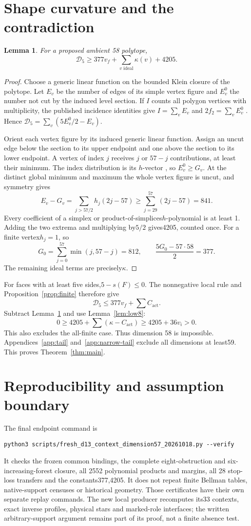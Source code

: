 \documentclass[11pt]{article}
\newtheorem{lemma}[theorem]{Lemma}
\theoremstyle{remark}\newtheorem{remark}[theorem]{Remark}
\newcommand{\Dfive}{\mathcal D_5}
\newcommand{\act}{\mathrm{act}}
\begin{document}
\section{Shape curvature and the contradiction}
\begin{lemma}\label{lem:shape}
For a proposed ambient 58 polytope,
\[
 \Dfive\ge377v_f+\sum_{v\text{ ideal}}\kappa(v)+4205.
\]
\end{lemma}
\begin{proof}
Choose a generic linear function on the bounded Klein closure of
the polytope. Let $E_v$ be the number of edges of its simple vertex
figure and $E_v^0$ the number not cut by the induced level section.
If $I$ counts all polygon vertices with multiplicity, the published
incidence identities give $I=\sum_vE_v$ and
$2f_2=\sum_vE_v^0$ \cite[Theorem9]{Khovanskii}. Hence
$\Dfive=\sum_v(5E_v^0/2-E_v)$.

Orient each vertex figure by its induced generic linear function.
Assign an uncut edge below the section to its upper endpoint and
one above the section to its lower endpoint. A vertex of index $j$
receives $j$ or $57-j$ contributions, at least their minimum.
The index distribution is its $h$-vector
\cite[Theorems2 and 6]{Khovanskii}, so $E_v^0\ge G_v$.
At the distinct global minimum and maximum the whole
vertex figure is uncut, and symmetry gives
\[
 E_v-G_v=\sum_{j>57/2}h_j(2j-57)\ge\sum_{j=29}^{57}(2j-57)=841.
\]
Every coefficient of a simplex or product-of-simplices$h$-polynomial is
at least 1. Adding the two extrema and multiplying by$5/2$ gives4205,
counted once. For a finite vertex$h_j=1$, so
\[
 G_0=\sum_{j=0}^{57}\min(j,57-j)=812,
 \qquad\frac{5G_0-57\cdot58}{2}=377.
\]
The remaining ideal terms are precisely$\kappa$.
\end{proof}

For faces with at least five sides,$5-s(F)\le0$. The nonnegative local
rule and Proposition~\ref{prop:finite} therefore give
\[
 \Dfive\le377v_f+\sum C_{\act}.
\]
Subtract Lemma~\ref{lem:shape} and use Lemma~\ref{lem:low8}:
\[
 0\ge4205+\sum(\kappa-C_{\act})\ge4205+36v_i>0.
\]
This also excludes the all-finite case. Thus dimension 58 is impossible.
Appendices~\ref{app:tail} and~\ref{app:narrow-tail} exclude all
dimensions at least59. This proves Theorem~\ref{thm:main}.

\section{Reproducibility and assumption boundary}
The final endpoint command is
\begin{verbatim}
python3 scripts/fresh_d13_context_dimension57_20261018.py --verify
\end{verbatim}
It checks the frozen common bindings, the complete eight-obstruction and
six-increasing-forest closure, all 2552 polynomial products and margins,
all 28 stop-loss transfers and the constants377,4205. It does not repeat
finite Bellman tables, native-support censuses or historical geometry.
Those certificates have their own separate replay commands. The new local
producer recomputes its33 contexts, exact inverse profiles, physical stars
and marked-role interfaces; the written arbitrary-support argument remains
part of its proof, not a finite absence test.
\end{document}
